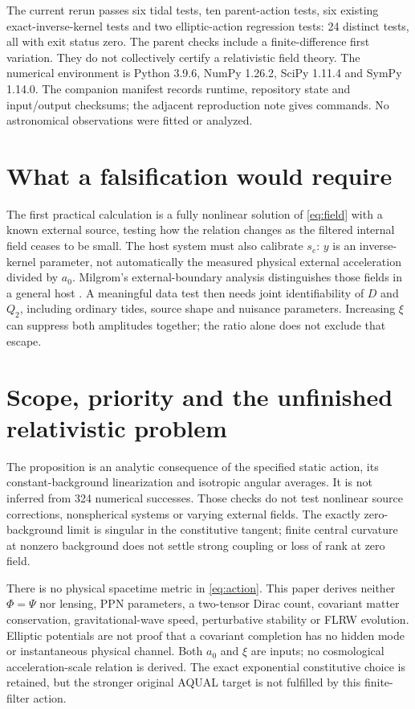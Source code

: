 \documentclass[11pt,letterpaper]{article}
\begin{document}
The current rerun passes six tidal tests, ten parent-action tests, six
existing exact-inverse-kernel tests and two elliptic-action regression tests:
24 distinct tests, all with exit status zero. The parent checks include a
finite-difference first variation. They do not collectively certify a
relativistic field theory. The numerical environment is Python 3.9.6,
NumPy 1.26.2, SciPy 1.11.4 and SymPy 1.14.0. The companion manifest records
runtime, repository state and input/output checksums; the adjacent reproduction
note gives commands. No astronomical observations were fitted or analyzed.

\section{What a falsification would require}
The first practical calculation is a fully nonlinear solution of
\eqref{eq:field} with a known external source, testing how the relation changes
as the filtered internal field ceases to be small. The host system must also
calibrate $s_e$: $y$ is an inverse-kernel parameter, not automatically the
measured physical external acceleration divided by $a_0$.
Milgrom's external-boundary analysis distinguishes those fields in a general
host \cite{qumond}. A meaningful data test then needs joint identifiability
of $D$ and $Q_2$, including ordinary tides, source shape and nuisance
parameters. Increasing $\xi$ can suppress both amplitudes together; the ratio
alone does not exclude that escape.

\newpage
\section{Scope, priority and the unfinished relativistic problem}
The proposition is an analytic consequence of the specified static action,
its constant-background linearization and isotropic angular averages. It is
not inferred from 324 numerical successes. Those checks do not test nonlinear
source corrections, nonspherical systems or varying external fields. The
exactly zero-background limit is singular in the constitutive tangent; finite
central curvature at nonzero background does not settle strong coupling or
loss of rank at zero field.

There is no physical spacetime metric in \eqref{eq:action}. This paper derives
neither $\Phi=\Psi$ nor lensing, PPN parameters, a two-tensor Dirac count,
covariant matter conservation, gravitational-wave speed, perturbative
stability or FLRW evolution. Elliptic potentials are not proof that a
covariant completion has no hidden mode or instantaneous physical channel.
Both $a_0$ and $\xi$ are inputs; no cosmological acceleration-scale relation
is derived. The exact exponential constitutive choice is retained, but the
stronger original AQUAL target is not fulfilled by this finite-filter action.
\end{document}
